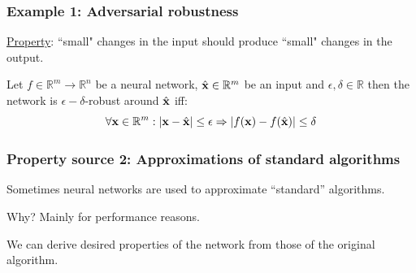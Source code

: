 \documentclass[t,compress,aspectratio=169]{beamer}
\begin{document}
\begin{frame}
\frametitle{Example 1: Adversarial robustness}

\underline{Property}: ``small" changes in the input should produce ``small" changes in the output.


\vspace{2em}

\pause
\pause

\vspace{1em}

\begin{definition}[Robustness]
Let $f \in \mathbb{R}^m \rightarrow \mathbb{R}^n$ be a neural network, $\hat{\mathbf{x}} \in \mathbb{R}^m$ be an input and $\epsilon, \delta \in \mathbb{R}$ then the network is $\epsilon-\delta$-robust around $\hat{\mathbf{x}}$ iff:
\begin{equation*}
\forall \mathbf{x} \in \mathbb{R}^m: | \mathbf{x} - \hat{\mathbf{x}} | \leq \epsilon \Rightarrow | f(\mathbf{x}) - f(\hat{\mathbf{x}}) | \leq \delta
\end{equation*}
\end{definition}

\end{frame}

\begin{frame}
\frametitle{Property source 2: Approximations of standard algorithms}

Sometimes neural networks are used to approximate ``standard'' algorithms.

\vspace{1em}
\pause

Why? Mainly for performance reasons.

\vspace{1em}
\pause

We can derive desired properties of the network from those of the original algorithm.
\end{frame}
\end{document}
